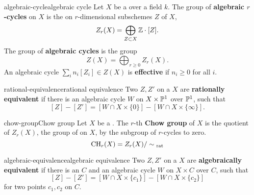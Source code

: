 \begin{topic}{algebraic-cycle}{algebraic cycle}
    Let $X$ be a  over a field $k$. The group of \textbf{algebraic $r$-cycles} on $X$ is the  on $r$-dimensional   subschemes $Z$ of $X$,
    \[ Z_r(X) = \bigoplus_{Z \subset X} \mathbb{Z} \cdot [Z] . \]
    The group of \textbf{algebraic cycles} is the  group
    \[ Z(X) = \bigoplus_{r \ge 0} Z_r(X) . \]
    An algebraic cycle $\sum_i n_i [Z_i] \in Z(X)$ is \textbf{effective} if $n_i \ge 0$ for all $i$.
\end{topic}

\begin{topic}{rational-equivalence}{rational equivalence}
    Two  $Z, Z'$ on a  $X$ are \textbf{rationally equivalent} if there is an algebraic cycle $W$ on $X \times \mathbb{P}^1$  over $\mathbb{P}^1$, such that
    \[ [Z] - [Z'] = [W \cap X \times \{ 0 \}] - [W \cap X \times \{ \infty \}] . \]
\end{topic}

\begin{topic}{chow-group}{Chow group}
    Let $X$ be a . The $r$-th \textbf{Chow group} of $X$ is the quotient of $Z_r(X)$, the group of  on $X$, by the subgroup of $r$-cycles  to zero.
    \[ \textup{CH}_r(X) = Z_r(X) / \sim{}_\textup{rat} \]
\end{topic}

\begin{topic}{algebraic-equivalence}{algebraic equivalence}
    Two  $Z, Z'$ on a  $X$ are \textbf{algebraically equivalent} if there is an  $C$ and an algebraic cycle $W$ on $X \times C$  over $C$, such that
    \[ [Z] - [Z'] = [W \cap X \times \{ c_1 \}] - [W \cap X \times \{ c_2 \}] \]
    for two points $c_1, c_2$ on $C$.
\end{topic}

